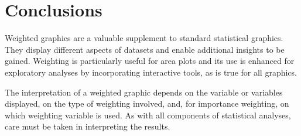 \documentclass{svmult}
\begin{document}
\section{Conclusions}
\label{conc}
Weighted graphics are a valuable supplement to standard statistical graphics.  They display different aspects of datasets and enable additional insights to be gained.  Weighting is particularly useful for area plots and its use is enhanced for exploratory analyses by incorporating interactive tools, as is true for all graphics.

The interpretation of a weighted graphic depends on the variable or variables displayed, on the type of weighting involved, and, for importance weighting, on which weighting variable is used.  As with all components of statistical analyses, care must be taken in interpreting the results.

% 


\end{document}
